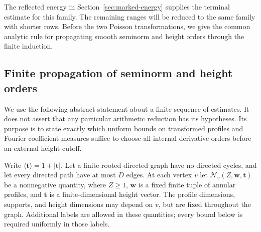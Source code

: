 \documentclass[11pt,a4paper]{article}
\numberwithin{equation}{section}
\numberwithin{figure}{section}
\theoremstyle{definition}
\theoremstyle{remark}
\begin{document}
The reflected energy in Section~\ref{sec:marked-energy} supplies the
terminal estimate for this family. The remaining ranges will be reduced
to the same family with shorter rows. Before the two Poisson
transformations, we give the common analytic rule for propagating smooth
seminorm and height orders through the finite induction.

\subsection{Finite propagation of seminorm and height orders}\label{sec:moment-propagation}

We use the following abstract statement about a finite sequence of estimates. It
does not assert that any particular arithmetic reduction has its hypotheses.
Its purpose is to state exactly which uniform bounds on transformed profiles
and Fourier coefficient measures suffice to choose all internal derivative
orders before an external height cutoff.

Write $\langle\boldsymbol t\rangle=1+|\boldsymbol t|$.  Let a finite rooted
directed graph have no directed cycles, and let every directed path have at
most $D$ edges.  At each vertex $v$ let
$\mathcal N_v(Z,\boldsymbol w,\boldsymbol t)$ be a nonnegative quantity,
where $Z\ge1$, $\boldsymbol w$ is a fixed finite tuple of annular profiles,
and $\boldsymbol t$ is a finite-dimensional height vector.  The profile
dimensions, supports, and height dimensions may depend on $v$, but are fixed
throughout the graph.  Additional labels are allowed in these quantities;
every bound below is required uniformly in those labels.
\end{document}
